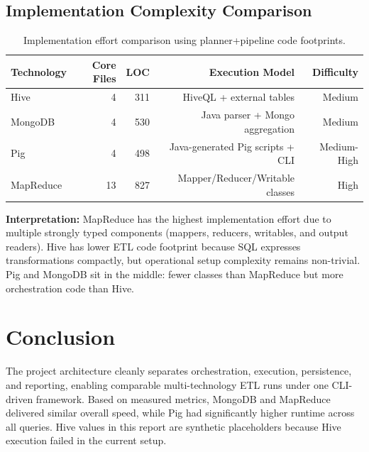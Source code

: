 \documentclass[12pt,a4paper]{article}
\begin{document}
\subsection{Implementation Complexity Comparison}

\begin{table}[h!]
\centering
\begin{tabular}{lrrrr}
\toprule
\textbf{Technology} & \textbf{Core Files} & \textbf{LOC} & \textbf{Execution Model} & \textbf{Difficulty} \\
\midrule
Hive & 4 & 311 & HiveQL + external tables & Medium \\
MongoDB & 4 & 530 & Java parser + Mongo aggregation & Medium \\
Pig & 4 & 498 & Java-generated Pig scripts + CLI & Medium-High \\
MapReduce & 13 & 827 & Mapper/Reducer/Writable classes & High \\
\bottomrule
\end{tabular}
\caption{Implementation effort comparison using planner+pipeline code footprints.}
\end{table}

\textbf{Interpretation:} MapReduce has the highest implementation effort due to multiple strongly typed components (mappers, reducers, writables, and output readers). Hive has lower ETL code footprint because SQL expresses transformations compactly, but operational setup complexity remains non-trivial. Pig and MongoDB sit in the middle: fewer classes than MapReduce but more orchestration code than Hive.

\section{Conclusion}

The project architecture cleanly separates orchestration, execution, persistence, and reporting, enabling comparable multi-technology ETL runs under one CLI-driven framework. Based on measured metrics, MongoDB and MapReduce delivered similar overall speed, while Pig had significantly higher runtime across all queries. Hive values in this report are synthetic placeholders because Hive execution failed in the current setup.
\end{document}
